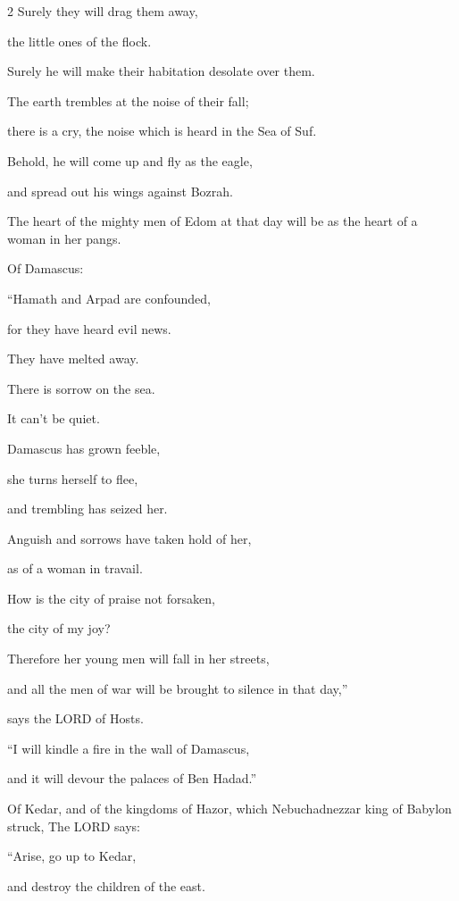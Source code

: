 \begin{multicols}{2}
Surely they will drag them away,

the little ones of the flock.

Surely he will make their habitation desolate over them.


\myverse{}The earth trembles at the noise of their fall;

there is a cry, the noise which is heard in the Sea of Suf.


\myverse{}Behold, he will come up and fly as the eagle,

and spread out his wings against Bozrah.

The heart of the mighty men of Edom at that day will be as the heart of a woman
in her pangs.

\vspace{\baselineskip}

\myverse{}Of Damascus:

“Hamath and Arpad are confounded,

for they have heard evil news.

They have melted away.

There is sorrow on the sea.

It can’t be quiet.


\myverse{}Damascus has grown feeble,

she turns herself to flee,

and trembling has seized her.

Anguish and sorrows have taken hold of her,

as of a woman in travail.


\myverse{}How is the city of praise not forsaken,

the city of my joy?


\myverse{}Therefore her young men will fall in her streets,

and all the men of war will be brought to silence in that day,”

says the LORD of Hosts.


\myverse{}“I will kindle a fire in the wall of Damascus,

and it will devour the palaces of Ben Hadad.”

\vspace{\baselineskip}

\myverse{}Of Kedar, and of the kingdoms of Hazor, which Nebuchadnezzar
king of Babylon struck, The LORD says:

“Arise, go up to Kedar,

and destroy the children of the east.



\end{multicols}
